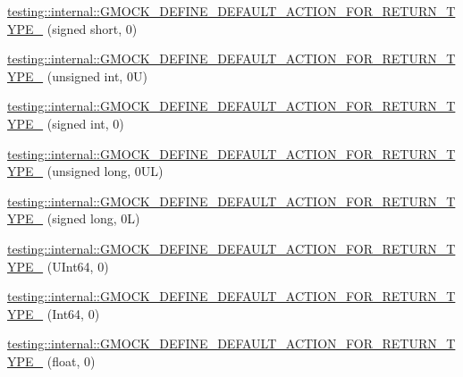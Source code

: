 \begin{DoxyCompactItemize}
\item 
\mbox{\hyperlink{namespacetesting_1_1internal_ae6ea5db83b290e2412f321c3b1eb8c47}{testing\+::internal\+::\+G\+M\+O\+C\+K\+\_\+\+D\+E\+F\+I\+N\+E\+\_\+\+D\+E\+F\+A\+U\+L\+T\+\_\+\+A\+C\+T\+I\+O\+N\+\_\+\+F\+O\+R\+\_\+\+R\+E\+T\+U\+R\+N\+\_\+\+T\+Y\+P\+E\+\_\+}} (signed short, 0)
\item 
\mbox{\hyperlink{namespacetesting_1_1internal_a4285332d8eae4bdfffc13b6c05252c30}{testing\+::internal\+::\+G\+M\+O\+C\+K\+\_\+\+D\+E\+F\+I\+N\+E\+\_\+\+D\+E\+F\+A\+U\+L\+T\+\_\+\+A\+C\+T\+I\+O\+N\+\_\+\+F\+O\+R\+\_\+\+R\+E\+T\+U\+R\+N\+\_\+\+T\+Y\+P\+E\+\_\+}} (unsigned int, 0\+U)
\item 
\mbox{\hyperlink{namespacetesting_1_1internal_a200a33af38e17df617883567c4fd96ab}{testing\+::internal\+::\+G\+M\+O\+C\+K\+\_\+\+D\+E\+F\+I\+N\+E\+\_\+\+D\+E\+F\+A\+U\+L\+T\+\_\+\+A\+C\+T\+I\+O\+N\+\_\+\+F\+O\+R\+\_\+\+R\+E\+T\+U\+R\+N\+\_\+\+T\+Y\+P\+E\+\_\+}} (signed int, 0)
\item 
\mbox{\hyperlink{namespacetesting_1_1internal_a1f4167b954a7ff0074ce8a5bb855f86f}{testing\+::internal\+::\+G\+M\+O\+C\+K\+\_\+\+D\+E\+F\+I\+N\+E\+\_\+\+D\+E\+F\+A\+U\+L\+T\+\_\+\+A\+C\+T\+I\+O\+N\+\_\+\+F\+O\+R\+\_\+\+R\+E\+T\+U\+R\+N\+\_\+\+T\+Y\+P\+E\+\_\+}} (unsigned long, 0\+U\+L)
\item 
\mbox{\hyperlink{namespacetesting_1_1internal_ad8804e25537427755c324ab03a72e776}{testing\+::internal\+::\+G\+M\+O\+C\+K\+\_\+\+D\+E\+F\+I\+N\+E\+\_\+\+D\+E\+F\+A\+U\+L\+T\+\_\+\+A\+C\+T\+I\+O\+N\+\_\+\+F\+O\+R\+\_\+\+R\+E\+T\+U\+R\+N\+\_\+\+T\+Y\+P\+E\+\_\+}} (signed long, 0\+L)
\item 
\mbox{\hyperlink{namespacetesting_1_1internal_ad2efcdbd12c7c020745b87bcc0997809}{testing\+::internal\+::\+G\+M\+O\+C\+K\+\_\+\+D\+E\+F\+I\+N\+E\+\_\+\+D\+E\+F\+A\+U\+L\+T\+\_\+\+A\+C\+T\+I\+O\+N\+\_\+\+F\+O\+R\+\_\+\+R\+E\+T\+U\+R\+N\+\_\+\+T\+Y\+P\+E\+\_\+}} (U\+Int64, 0)
\item 
\mbox{\hyperlink{namespacetesting_1_1internal_ab427739121a380a7934bda96153f053d}{testing\+::internal\+::\+G\+M\+O\+C\+K\+\_\+\+D\+E\+F\+I\+N\+E\+\_\+\+D\+E\+F\+A\+U\+L\+T\+\_\+\+A\+C\+T\+I\+O\+N\+\_\+\+F\+O\+R\+\_\+\+R\+E\+T\+U\+R\+N\+\_\+\+T\+Y\+P\+E\+\_\+}} (Int64, 0)
\item 
\mbox{\hyperlink{namespacetesting_1_1internal_a71c697e5b567365fd3ff6c720769633b}{testing\+::internal\+::\+G\+M\+O\+C\+K\+\_\+\+D\+E\+F\+I\+N\+E\+\_\+\+D\+E\+F\+A\+U\+L\+T\+\_\+\+A\+C\+T\+I\+O\+N\+\_\+\+F\+O\+R\+\_\+\+R\+E\+T\+U\+R\+N\+\_\+\+T\+Y\+P\+E\+\_\+}} (float, 0)
\item 

\end{DoxyCompactItemize}
